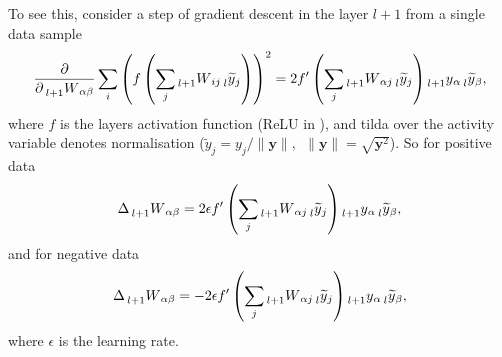 \documentclass[a4paper, 11pt]{article}
\begin{document}
To see this, consider a step of gradient descent in the layer $l+1$ from a single data sample
\begin{align*}
  \frac{\partial}{\partial\prescript{}{l+1}W_{\alpha\beta}}\sum_i \left(f\left(\sum_j\prescript{}{l+1}W_{ij}\prescript{}{l}{\widetilde{y}}_j\right)\right)^2 = 2f^\prime\left(\sum_j\prescript{}{l+1}W_{\alpha j}\prescript{}{l}{\widetilde{y}}_j\right)\prescript{}{l+1}{y}_\alpha\prescript{}{l}{\widetilde{y}}_\beta,
  \end{align*}
  where $f$ is the layers activation function (ReLU in \cite{hinton2022forwardforwardalgorithmpreliminaryinvestigations}), and tilda over the activity variable denotes normalisation (${\widetilde{y}}_j = y_j/\|\mathbf y\|,\ \ \|\mathbf y\| = \sqrt{\mathbf y^2}$). So for positive data
  \begin{equation*}
    \Delta \prescript{}{l+1}W_{\alpha\beta} = 2\epsilon f^\prime\left(\sum_j\prescript{}{l+1}W_{\alpha j}\prescript{}{l}{\widetilde{y}}_j\right)\prescript{}{l+1}{y}_\alpha\prescript{}{l}{\widetilde{y}}_\beta,
  \end{equation*}
  and for negative data
  \begin{equation*}
    \Delta \prescript{}{l+1}W_{\alpha\beta} = -2\epsilon f^\prime\left(\sum_j\prescript{}{l+1}W_{\alpha j}\prescript{}{l}{\widetilde{y}}_j\right)\prescript{}{l+1}{y}_\alpha\prescript{}{l}{\widetilde{y}}_\beta,
  \end{equation*}
  where $\epsilon$ is the learning rate.





\end{document}
